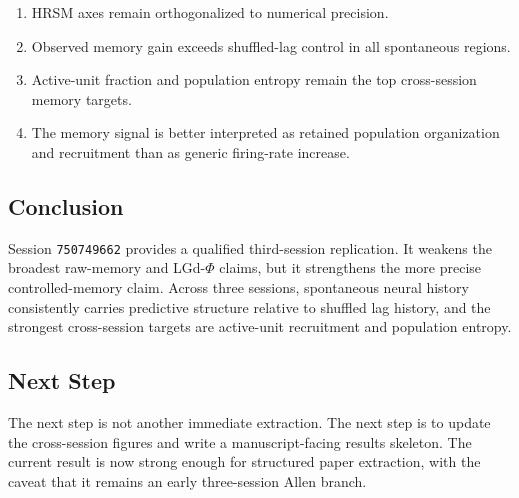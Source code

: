 \begin{enumerate}
    \item HRSM axes remain orthogonalized to numerical precision.
    \item Observed memory gain exceeds shuffled-lag control in all spontaneous regions.
    \item Active-unit fraction and population entropy remain the top cross-session memory targets.
    \item The memory signal is better interpreted as retained population organization and recruitment than as generic firing-rate increase.
\end{enumerate}

\subsection{Conclusion}

Session \texttt{750749662} provides a qualified third-session replication. It weakens the broadest raw-memory and LGd-\(\Phi\) claims, but it strengthens the more precise controlled-memory claim. Across three sessions, spontaneous neural history consistently carries predictive structure relative to shuffled lag history, and the strongest cross-session targets are active-unit recruitment and population entropy.

\subsection{Next Step}

The next step is not another immediate extraction. The next step is to update the cross-session figures and write a manuscript-facing results skeleton. The current result is now strong enough for structured paper extraction, with the caveat that it remains an early three-session Allen branch.
